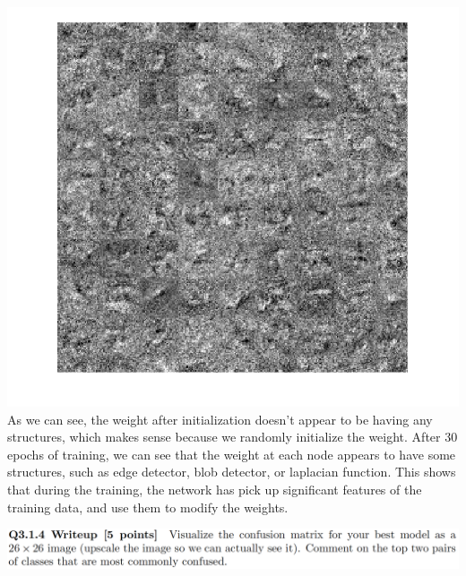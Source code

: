 \documentclass[12pt,letterpaper,boxed]{hmcpset}
\begin{document}
\begin{solution}
\includegraphics[width=\textwidth]{3_1_3_111.png}\\
As we can see, the weight after initialization doesn't appear to be having any structures, which makes sense
because we randomly initialize the weight. After 30 epochs of training, we can see that the weight at each node
appears to have some structures, such as edge detector, blob detector, or laplacian function. This shows that
during the training, the network has pick up significant features of the training data, and use them to modify
the weights. 
\end{solution}
\newpage

\begin{problem}[]
\includegraphics[width=\textwidth]{3_1_4.png}
\end{problem}
\end{document}
